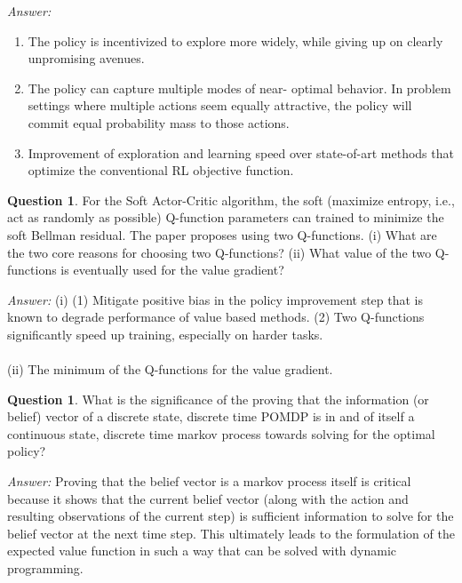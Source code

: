 \documentclass{article}
\theoremstyle{definition}
\newtheorem{question}[thm]{Question}
\newenvironment{answer}{\noindent\textit{Answer:}}{}
\begin{document}
\begin{answer}
    \begin{enumerate}
        \item The policy is incentivized to explore more widely, while giving up on clearly unpromising avenues.
        \item The policy can capture multiple modes of near- optimal behavior. In problem settings where multiple actions seem equally attractive, the policy will commit equal probability mass to those actions.
        \item Improvement of exploration and learning speed over state-of-art methods that optimize the conventional RL objective function.
    \end{enumerate}
\end{answer}

\begin{question}
    For the Soft Actor-Critic algorithm, the soft (maximize entropy, i.e., act as randomly as possible) Q-function parameters can trained to minimize the soft Bellman residual. The paper proposes using two Q-functions. (i) What are the two core reasons for choosing two Q-functions? (ii) What value of the two Q-functions is eventually used for the value gradient?
\end{question}

\begin{answer}
(i) (1) Mitigate positive bias in the policy improvement step that is known to degrade performance of value based methods. (2) Two Q-functions significantly speed up training, especially on harder tasks. \\\\
(ii) The minimum of the Q-functions for the value gradient. \\
\end{answer}

\begin{question}
What is the significance of the proving that the information (or belief) vector of a discrete state, discrete time POMDP is in and of itself a continuous state, discrete time markov process towards solving for the optimal policy?
\end{question}

\begin{answer}
Proving that the belief vector is a markov process itself is critical because it shows that the current belief vector (along with the action and resulting observations of the current step) is sufficient information to solve for the belief vector at the next time step. This ultimately leads to the formulation of the expected value function in such a way that can be solved with dynamic programming.
\end{answer}
\end{document}
